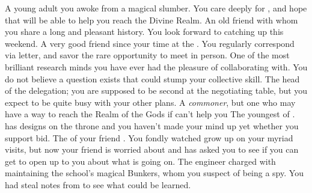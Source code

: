 \documentclass[char]{GL2020}
\begin{document}
\begin{contacts}
    \contact{\cDisney{}} A young adult you awoke from a magical slumber. You care deeply for \cDisney{\them}, and hope that \cDisney{\they} will be able to help you reach the Divine Realm.
    \contact{\cHistory{}} An old friend with whom you share a long and pleasant history. You look forward to catching up this weekend.
    \contact{\cHedonist{}} A very good friend since your time at the \pSchool{}. You regularly correspond via letter, and savor the rare opportunity to meet in person. 
    \contact{\cLibrarian{}} One of the most brilliant research minds you have ever had the pleasure of collaborating with. You do not believe a question exists that could stump your collective skill.
    \contact{\cEvil{}} The head of the \pFarm{} delegation; you are supposed to be \cEvil{\their} second at the negotiating table, but you expect to be quite busy with your other plans.
    \contact{\cCurse{}} A \emph{commoner}, but one who may have a way to reach the Realm of the Gods if \cDisney{} can’t help you
    \contact{\cPrince{}} The youngest \cPrince{\offspring} of \cQueen{\Monarch} \cQueen{}. \cPrince{} has designs on the throne and you haven’t made your mind up yet whether you support \cPrince{\their} bid.
    \contact{\cChupStudent{}} The \cChupStudent{\child} of your friend \cWildcardFriend{}. You fondly watched \cChupStudent{\them} grow up on your myriad visits, but now your friend is worried about \cChupStudent{} and has asked you to see if you can get \cChupStudent{\them} to open up to you about what is going on.
    \contact{\cBunker{}} The \pShippie{} engineer charged with maintaining the school’s magical Bunkers, whom you suspect of being a spy. You had \cDisney{} steal notes from \cBunker{\them} to see what could be learned.
\end{contacts}
\end{document}
